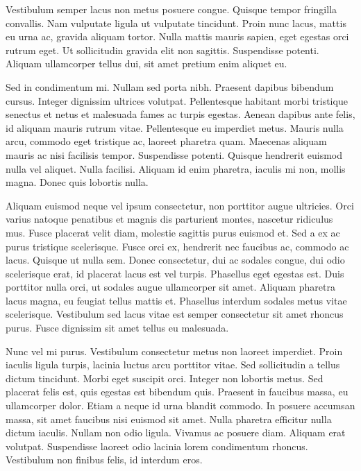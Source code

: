 \documentclass[12pt, a4paper, reqno]{amsart}
\begin{document}
Vestibulum semper lacus non metus posuere congue. Quisque tempor fringilla convallis. Nam vulputate ligula ut vulputate tincidunt. Proin nunc lacus, mattis eu urna ac, gravida aliquam tortor. Nulla mattis mauris sapien, eget egestas orci rutrum eget. Ut sollicitudin gravida elit non sagittis. Suspendisse potenti. Aliquam ullamcorper tellus dui, sit amet pretium enim aliquet eu.

Sed in condimentum mi. Nullam sed porta nibh. Praesent dapibus bibendum cursus. Integer dignissim ultrices volutpat. Pellentesque habitant morbi tristique senectus et netus et malesuada fames ac turpis egestas. Aenean dapibus ante felis, id aliquam mauris rutrum vitae. Pellentesque eu imperdiet metus. Mauris nulla arcu, commodo eget tristique ac, laoreet pharetra quam. Maecenas aliquam mauris ac nisi facilisis tempor. Suspendisse potenti. Quisque hendrerit euismod nulla vel aliquet. Nulla facilisi. Aliquam id enim pharetra, iaculis mi non, mollis magna. Donec quis lobortis nulla.

Aliquam euismod neque vel ipsum consectetur, non porttitor augue ultricies. Orci varius natoque penatibus et magnis dis parturient montes, nascetur ridiculus mus. Fusce placerat velit diam, molestie sagittis purus euismod et. Sed a ex ac purus tristique scelerisque. Fusce orci ex, hendrerit nec faucibus ac, commodo ac lacus. Quisque ut nulla sem. Donec consectetur, dui ac sodales congue, dui odio scelerisque erat, id placerat lacus est vel turpis. Phasellus eget egestas est. Duis porttitor nulla orci, ut sodales augue ullamcorper sit amet. Aliquam pharetra lacus magna, eu feugiat tellus mattis et. Phasellus interdum sodales metus vitae scelerisque. Vestibulum sed lacus vitae est semper consectetur sit amet rhoncus purus. Fusce dignissim sit amet tellus eu malesuada.

Nunc vel mi purus. Vestibulum consectetur metus non laoreet imperdiet. Proin iaculis ligula turpis, lacinia luctus arcu porttitor vitae. Sed sollicitudin a tellus dictum tincidunt. Morbi eget suscipit orci. Integer non lobortis metus. Sed placerat felis est, quis egestas est bibendum quis. Praesent in faucibus massa, eu ullamcorper dolor. Etiam a neque id urna blandit commodo. In posuere accumsan massa, sit amet faucibus nisi euismod sit amet. Nulla pharetra efficitur nulla dictum iaculis. Nullam non odio ligula. Vivamus ac posuere diam. Aliquam erat volutpat. Suspendisse laoreet odio lacinia lorem condimentum rhoncus. Vestibulum non finibus felis, id interdum eros. 
\end{document}
